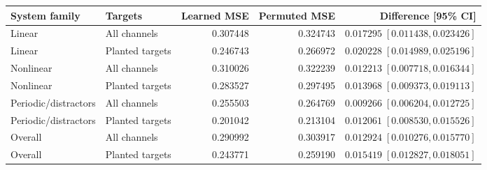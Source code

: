 \begin{tabular}{llrrr}
\toprule
System family & Targets & Learned MSE & Permuted MSE & Difference [95\% CI]\\
\midrule
Linear & All channels & 0.307448 & 0.324743 & $0.017295\;[0.011438,0.023426]$\\
Linear & Planted targets & 0.246743 & 0.266972 & $0.020228\;[0.014989,0.025196]$\\
Nonlinear & All channels & 0.310026 & 0.322239 & $0.012213\;[0.007718,0.016344]$\\
Nonlinear & Planted targets & 0.283527 & 0.297495 & $0.013968\;[0.009373,0.019113]$\\
Periodic/distractors & All channels & 0.255503 & 0.264769 & $0.009266\;[0.006204,0.012725]$\\
Periodic/distractors & Planted targets & 0.201042 & 0.213104 & $0.012061\;[0.008530,0.015526]$\\
Overall & All channels & 0.290992 & 0.303917 & $0.012924\;[0.010276,0.015770]$\\
Overall & Planted targets & 0.243771 & 0.259190 & $0.015419\;[0.012827,0.018051]$\\
\bottomrule
\end{tabular}
